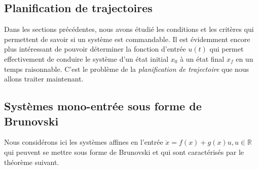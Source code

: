 \begin{theoreme}
\section{Planification de trajectoires}

Dans les sections précédentes, nous avons étudié les conditions et les
critères qui permettent de savoir si un système est commandable. Il
est évidemment encore plus intéressant de pouvoir déterminer la
fonction d'entrée $u(t)$ qui permet effectivement de conduire le
système d'un état initial $x_0$ à un état final $x_f$ en un temps
raisonnable. C'est le problème de la {\it planification de trajectoire}
que nous allons traiter maintenant.

\subsection{Systèmes mono-entrée sous forme de Brunovski}
Nous considérons ici les systèmes affines en l'entrée $\dot x = f(x) +
g(x)u, u \in \mathbb{R}$ qui peuvent se mettre sous forme de Brunovski et qui
sont caractérisés par le théorème suivant.
\begin{theoreme}



\end{theoreme}
\end{theoreme}
